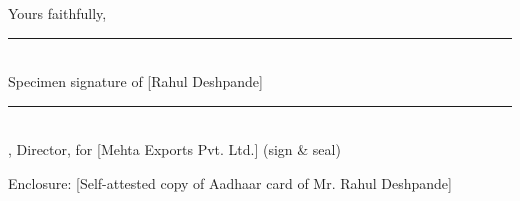 \documentclass[10pt]{article}
\begin{document}
Yours faithfully,\par\vspace{4pt}

\vspace{32pt}\noindent\parbox[t]{0.3\linewidth}{\centering\rule{\linewidth}{0.5pt}\\ Specimen signature of [Rahul Deshpande]}\hfill\parbox[t]{0.3\linewidth}{\centering\rule{\linewidth}{0.5pt}\\ [Anil Mehta], Director, for [Mehta Exports Pvt. Ltd.] (sign \& seal)}\par

Enclosure: [Self-attested copy of Aadhaar card of Mr. Rahul Deshpande]\par\vspace{4pt}
\end{document}
